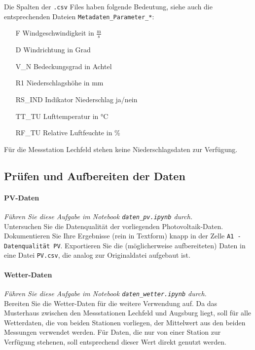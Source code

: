\documentclass[11pt,a4paper]{article}
\begin{document}
Die Spalten der \texttt{.csv} Files haben folgende Bedeutung, siehe auch die entsprechenden Dateien \texttt{Metadaten\_Parameter\_*}:
\begin{center}
    \begin{minipage}{0.8\linewidth}
        \begin{itemize}
            \item[   F] Windgeschwindigkeit in $\frac{\text{m}}{\text{s}}$
            \item[   D] Windrichtung in Grad
            \item[ V\_N] Bedeckungsgrad in Achtel
            \item[  R1] Niederschlagshöhe in mm
            \item[RS\_IND] Indikator Niederschlag ja/nein
            \item[TT\_TU] Lufttemperatur in °C
            \item[RF\_TU] Relative Luftfeuchte in \%
        \end{itemize}
    \end{minipage}
\end{center}
Für die Messstation Lechfeld stehen keine Niederschlagsdaten zur Verfügung.

\subsection*{Prüfen und Aufbereiten der Daten}
\paragraph*{PV-Daten}
\emph{Führen Sie diese Aufgabe im Notebook \texttt{daten\_pv.ipynb} durch.}\\
Untersuchen Sie die Datenqualität der vorliegenden Photovoltaik-Daten. Dokumentieren Sie Ihre Ergebnisse (rein in Textform) knapp in der Zelle \texttt{A1 - Datenqualität PV}. Exportieren Sie die (möglicherweise aufbereiteten) Daten in eine Datei \texttt{PV.csv}, die analog zur Originaldatei aufgebaut ist.

\paragraph*{Wetter-Daten}
\emph{Führen Sie diese Aufgabe im Notebook \texttt{daten\_wetter.ipynb} durch.}\\
Bereiten Sie die Wetter-Daten für die weitere Verwendung auf. Da das Musterhaus zwischen den Messstationen Lechfeld und Augsburg liegt, soll für alle Wetterdaten, die von beiden Stationen vorliegen, der Mittelwert aus den beiden Messungen verwendet werden. Für Daten, die nur von einer Station zur Verfügung stehenen, soll entsprechend dieser Wert direkt genutzt werden.
\end{document}
